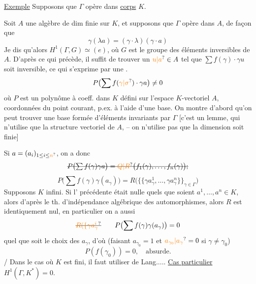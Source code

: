 
\uline{Exemple} Supposons que $\Gamma$ \uline{} opère  dans  \uline{corps} $K$.

Soit $A$ une algèbre de dim finie sur $K$, et supposons que $\Gamma$ opère dans $A$, de façon que
\[
\gamma(\lambda a)=(\gamma\cdot\lambda)(\gamma\cdot a)
\]
Je dis qu'alors $H^1(\Gamma,G)\simeq(e)$, où $G$ est le groupe des éléments inversibles de $A$. D'après ce qui précède, il suffit de trouver un $\unsure{u|a}\in A$ tel que $\sum f(\gamma)\cdot\gamma u$ soit inversible, ce qui s'exprime par une .
\[
P\bigl(\sum f(\unsure{\gamma|\sigma})\cdot\gamma a\bigr)\ne0
\]
où $P$ est un polynôme à coeff. dans $K$  défini sur l'espace $K$-vectoriel $A$,  coordonnées  du point courant, p.ex. à l'aide d'une base. On montre d'abord qu'on peut trouver une base formée d'éléments invariants par $\Gamma$ [c'est un lemme, qui n'utilise que la structure  vectoriel de $A$, -- on n'utilise pas que la dimension soit finie]

Si $a=(a_i)_{1\leq i\leq\unsure{n}}$, on a donc
\[
\deleted{P\bigl(\sum f(\gamma)\gamma a\bigr)=\unsure{Q|R}\bigl(f_1(\gamma),\ldots,f_n(\gamma)\bigr);}
\]
\[
P\bigl(\sum f(\gamma)\gamma(a_\gamma)\bigr)=R\bigl(\{\{\gamma a_\gamma^1,\ldots,\gamma a_\gamma^n\}\}_{\gamma\in\Gamma}\bigr)
\]
Supposons $K$ infini. Si l' précédente était nulle  quels que soient $a^1,\ldots,a^n\in K$, alors d'après le th. d'indépendance algébrique des automorphismes, alors $R$ est identiquement nul, en particulier on a \deleted{\unsure{$\sum$}} aussi
\[
\deleted{\unsure{R(\{\gamma a_\gamma^i}}\qquad P\bigl(\sum f(\gamma)\gamma(a_\gamma)\bigr)=0
\]
quel que soit le choix des $a_\gamma$, d'où (faisant $a_{\gamma_0}=1$ et $\unsure{a_{\gamma_0}|a_\gamma}=0$ si $\gamma\ne\gamma_0$)
\[
P(f(\gamma_0))=0,\quad\text{absurde.}
\]
/ Dans le cas où $K$ est fini, il faut utiliser  de Lang.....
 \uline{Cas particulier}\qquad\uline{$H^1(\Gamma,K^*)=0$}.

